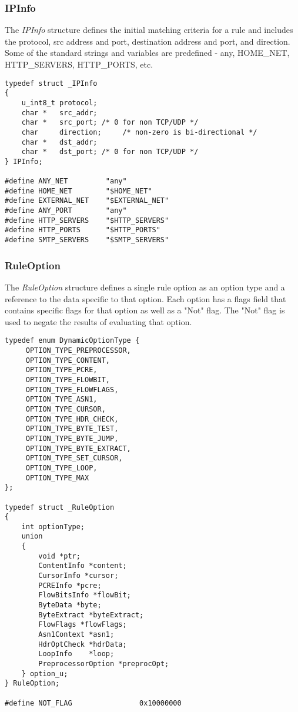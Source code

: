 \documentclass[english]{report}
\begin{document}
\subsubsection{IPInfo}

The {\em IPInfo} structure defines the initial matching criteria for a rule and
includes the protocol, src address and port, destination address and port, and
direction.  Some of the standard strings and variables are predefined - any,
HOME\_NET, HTTP\_SERVERS, HTTP\_PORTS, etc.

\begin{verbatim}
typedef struct _IPInfo
{
    u_int8_t protocol;
    char *   src_addr;
    char *   src_port; /* 0 for non TCP/UDP */
    char     direction;     /* non-zero is bi-directional */
    char *   dst_addr;
    char *   dst_port; /* 0 for non TCP/UDP */
} IPInfo;

#define ANY_NET         "any"
#define HOME_NET        "$HOME_NET"
#define EXTERNAL_NET    "$EXTERNAL_NET"
#define ANY_PORT        "any"
#define HTTP_SERVERS    "$HTTP_SERVERS"
#define HTTP_PORTS      "$HTTP_PORTS"
#define SMTP_SERVERS    "$SMTP_SERVERS"
\end{verbatim}

\subsubsection{RuleOption}

The {\em RuleOption} structure defines a single rule option as an option type
and a reference to the data specific to that option.  Each option has a flags
field that contains specific flags for that option as well as a "Not" flag.
The "Not" flag is used to negate the results of evaluating that option.

\begin{verbatim}
typedef enum DynamicOptionType {
     OPTION_TYPE_PREPROCESSOR,
     OPTION_TYPE_CONTENT,
     OPTION_TYPE_PCRE,
     OPTION_TYPE_FLOWBIT,
     OPTION_TYPE_FLOWFLAGS,
     OPTION_TYPE_ASN1,
     OPTION_TYPE_CURSOR,
     OPTION_TYPE_HDR_CHECK,
     OPTION_TYPE_BYTE_TEST,
     OPTION_TYPE_BYTE_JUMP,
     OPTION_TYPE_BYTE_EXTRACT,
     OPTION_TYPE_SET_CURSOR,
     OPTION_TYPE_LOOP,
     OPTION_TYPE_MAX
};

typedef struct _RuleOption
{
    int optionType;
    union
    {   
        void *ptr;
        ContentInfo *content;
        CursorInfo *cursor;
        PCREInfo *pcre;
        FlowBitsInfo *flowBit;
        ByteData *byte;
        ByteExtract *byteExtract;
        FlowFlags *flowFlags;
        Asn1Context *asn1;
        HdrOptCheck *hdrData;
        LoopInfo    *loop;
        PreprocessorOption *preprocOpt;
    } option_u;
} RuleOption;

#define NOT_FLAG                0x10000000
\end{verbatim}
\end{document}

